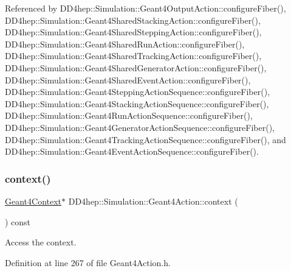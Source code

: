 Referenced by D\+D4hep\+::\+Simulation\+::\+Geant4\+Output\+Action\+::configure\+Fiber(), D\+D4hep\+::\+Simulation\+::\+Geant4\+Shared\+Stacking\+Action\+::configure\+Fiber(), D\+D4hep\+::\+Simulation\+::\+Geant4\+Shared\+Stepping\+Action\+::configure\+Fiber(), D\+D4hep\+::\+Simulation\+::\+Geant4\+Shared\+Run\+Action\+::configure\+Fiber(), D\+D4hep\+::\+Simulation\+::\+Geant4\+Shared\+Tracking\+Action\+::configure\+Fiber(), D\+D4hep\+::\+Simulation\+::\+Geant4\+Shared\+Generator\+Action\+::configure\+Fiber(), D\+D4hep\+::\+Simulation\+::\+Geant4\+Shared\+Event\+Action\+::configure\+Fiber(), D\+D4hep\+::\+Simulation\+::\+Geant4\+Stepping\+Action\+Sequence\+::configure\+Fiber(), D\+D4hep\+::\+Simulation\+::\+Geant4\+Stacking\+Action\+Sequence\+::configure\+Fiber(), D\+D4hep\+::\+Simulation\+::\+Geant4\+Run\+Action\+Sequence\+::configure\+Fiber(), D\+D4hep\+::\+Simulation\+::\+Geant4\+Generator\+Action\+Sequence\+::configure\+Fiber(), D\+D4hep\+::\+Simulation\+::\+Geant4\+Tracking\+Action\+Sequence\+::configure\+Fiber(), and D\+D4hep\+::\+Simulation\+::\+Geant4\+Event\+Action\+Sequence\+::configure\+Fiber().

\hypertarget{class_d_d4hep_1_1_simulation_1_1_geant4_action_aa9d87f0ec2a72b7fc2591b18f98d75cf}{}\label{class_d_d4hep_1_1_simulation_1_1_geant4_action_aa9d87f0ec2a72b7fc2591b18f98d75cf} 
\subsubsection{\texorpdfstring{context()}{context()}}
{\footnotesize\ttfamily \hyperlink{class_d_d4hep_1_1_simulation_1_1_geant4_context}{Geant4\+Context}$\ast$ D\+D4hep\+::\+Simulation\+::\+Geant4\+Action\+::context (\begin{DoxyParamCaption}{ }\end{DoxyParamCaption}) const\hspace{0.3cm}{\ttfamily [inline]}}



Access the context. 



Definition at line 267 of file Geant4\+Action.\+h.



